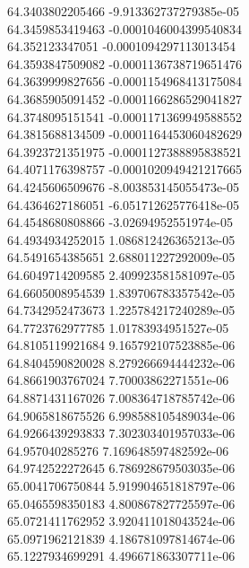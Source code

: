 {64.3403802205466 -9.913362737279385e-05 \\
64.3459853419463 -0.0001046004399540834 \\
64.352123347051 -0.0001094297113013454 \\
64.3593847509082 -0.0001136738719651476 \\
64.3639999827656 -0.0001154968413175084 \\
64.3685905091452 -0.0001166286529041827 \\
64.3748095151541 -0.0001171369949588552 \\
64.3815688134509 -0.0001164453060482629 \\
64.3923721351975 -0.0001127388895838521 \\
64.4071176398757 -0.0001020949421217665 \\
64.4245606509676 -8.003853145055473e-05 \\
64.4364627186051 -6.051712625776418e-05 \\
64.4548680808866 -3.02694952551974e-05 \\
64.4934934252015 1.086812426365213e-05 \\
64.5491654385651 2.688011227292009e-05 \\
64.6049714209585 2.409923581581097e-05 \\
64.6605008954539 1.839706783357542e-05 \\
64.7342952473673 1.225784217240289e-05 \\
64.7723762977785 1.01783934951527e-05 \\
64.8105119921684 9.165792107523885e-06 \\
64.8404590820028 8.279266694444232e-06 \\
64.8661903767024 7.70003862271551e-06 \\
64.8871431167026 7.008364718785742e-06 \\
64.9065818675526 6.998588105489034e-06 \\
64.9266439293833 7.302303401957033e-06 \\
64.957040285276 7.169648597482592e-06 \\
64.9742522272645 6.786928679503035e-06 \\
65.0041706750844 5.919904651818797e-06 \\
65.0465598350183 4.800867827725597e-06 \\
65.0721411762952 3.920411018043524e-06 \\
65.0971962121839 4.186781097814674e-06 \\
65.1227934699291 4.496671863307711e-06 \\
}
